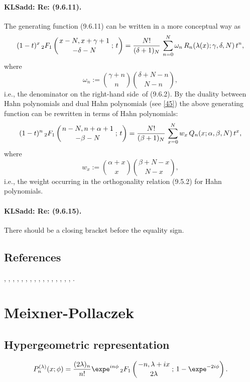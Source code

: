 \documentclass[envcountchap,graybox]{svmono}
\newcommand{\hyp}[5]{\mbox{}_{#1}{F}_{#2}
\left(\genfrac{}{}{0pt}{}{#3}{#4}\,;\,#5\right)}
\newcommand\al\alpha
\newcommand\be\beta
\newcommand\ga\gamma
\newcommand\de\delta
\newcommand\la\lambda
\newcommand\om\omega
\newcommand{\hyp}[5]{\,\mbox{}_{#1}F_{#2}\!\left(
  \genfrac{}{}{0pt}{}{#3}{#4};#5\right)}
\newcommand\RHS{right-hand side}
\begin{document}
\paragraph{\large\bf KLSadd: Re: (9.6.11).}The generating function (9.6.11) can be written in a more conceptual way as
\begin{equation}
(1-t)^x\,\hyp21{x-N,x+\ga+1}{-\de-N}t=\frac{N!}{(\de+1)_N}\,
\sum_{n=0}^N \om_n\,R_n(\la(x);\ga,\de,N)\,t^n,
\label{2}
\end{equation}
where
\begin{equation}
\om_n:=\binom{\ga+n}n \binom{\de+N-n}{N-n},
\label{3}
\end{equation}
i.e., the denominator on the \RHS\ of (9.6.2).
By the duality between Hahn polynomials and dual Hahn polynomials (see \eqref{45}) the above generating function can be rewritten in
terms of Hahn polynomials:
\begin{equation}
(1-t)^n\,\hyp21{n-N,n+\al+1}{-\be-N}t=\frac{N!}{(\be+1)_N}\,
\sum_{x=0}^N w_x\,Q_n(x;\al,\be,N)\,t^x,
\label{4}
\end{equation}
where
\begin{equation}
w_x:=\binom{\al+x}x \binom{\be+N-x}{N-x},
\label{5}
\end{equation}
i.e., the weight occurring in the orthogonality relation (9.5.2)
for Hahn polynomials.
\paragraph{\large\bf KLSadd: Re: (9.6.15).}There should be a closing bracket before the equality sign.
%
\subsection*{References}
\cite{Askey2005}, \cite{AskeyWilson85}, \cite{AtakRahmanSuslov}, \cite{AtakSuslov88},
\cite{Ismail2005II}, \cite{Karlin61}, \cite{Koorn81}, \cite{Koorn88}, \cite{Lesky93},
\cite{Lesky94I}, \cite{Lesky95I}, \cite{Lesky95II}, \cite{Nikiforov+}, \cite{NikiforovUvarov},
\cite{Rahman81II}, \cite{Stanton84}, \cite{Wilson80}.


\section{Meixner-Pollaczek}

\par\setcounter{equation}{0}

\subsection*{Hypergeometric representation}
\begin{equation}
\label{DefMP}
P_n^{(\lambda)}(x;\phi)=\frac{(2\lambda)_n}{n!}\expe^{in\phi}\,
\hyp{2}{1}{-n,\lambda+ix}{2\lambda}{1-\expe^{-2i\phi}}.
\end{equation}
\end{document}

